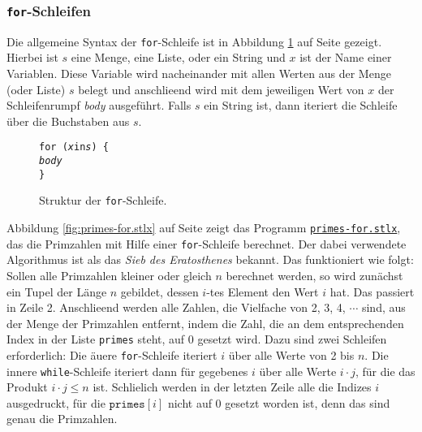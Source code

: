 \subsubsection{\texttt{for}-Schleifen}
Die allgemeine Syntax der \texttt{for}-Schleife ist in Abbildung \ref{fig:for} auf Seite
\pageref{fig:for} gezeigt.  Hierbei ist $s$ eine Menge, eine Liste, oder ein String und $x$ ist  der
Name einer 
Variablen. Diese Variable wird nacheinander mit allen Werten aus der Menge (oder Liste) $s$
belegt und anschlie\3end wird mit dem jeweiligen Wert von $x$ der
Schleifenrumpf \textsl{body} ausgef\"{u}hrt.  Falls $s$ ein String ist, dann iteriert die Schleife \"{u}ber
die Buchstaben aus $s$.

\begin{figure}[!ht]
  \centering
\begin{alltt}
      \texttt{for (}\textsl{x} \texttt{in} \textsl{s}\texttt{) \{}
          \textsl{body}
      \texttt{\}}
\end{alltt}
\vspace*{-0.3cm}
\caption{Struktur der \texttt{for}-Schleife.}  \label{fig:for}
\end{figure} 

Abbildung \ref{fig:primes-for.stlx} auf Seite
\pageref{fig:primes-for.stlx} zeigt das Programm
\href{https://github.com/karlstroetmann/Logik/blob/master/SetlX/primes-for.stlx}{\texttt{primes-for.stlx}},
das die Primzahlen mit Hilfe einer \texttt{for}-Schleife berechnet.
Der dabei verwendete Algorithmus ist als das \emph{Sieb des Eratosthenes}
bekannt.  Das funktioniert wie folgt: Sollen alle Primzahlen kleiner oder gleich
$n$ berechnet werden, so wird zun\"{a}chst ein Tupel der L\"{a}nge $n$ gebildet, dessen
$i$-tes Element den Wert $i$ hat.  Das passiert in Zeile 2.  Anschlie\3end werden 
 alle Zahlen, die Vielfache von 2, 3, 4, $\cdots$ sind, aus der Menge der
Primzahlen entfernt, indem die Zahl, die an dem entsprechenden Index in der Liste
\texttt{primes} steht, auf 0 gesetzt wird.
Dazu sind zwei Schleifen erforderlich: Die \"{a}u\3ere \texttt{for}-Schleife iteriert
$i$ \"{u}ber alle Werte von 2 bis $n$.  Die innere \texttt{while}-Schleife iteriert dann f\"{u}r
gegebenes $i$ \"{u}ber alle Werte $i \cdot j$, f\"{u}r die das Produkt $i \cdot j \leq n$ ist.
Schlie\3lich werden in der letzten  Zeile alle die
Indizes $i$ ausgedruckt, f\"{u}r die $\mathtt{primes}[i]$  nicht auf 0 gesetzt worden ist,
denn das sind genau die Primzahlen.

